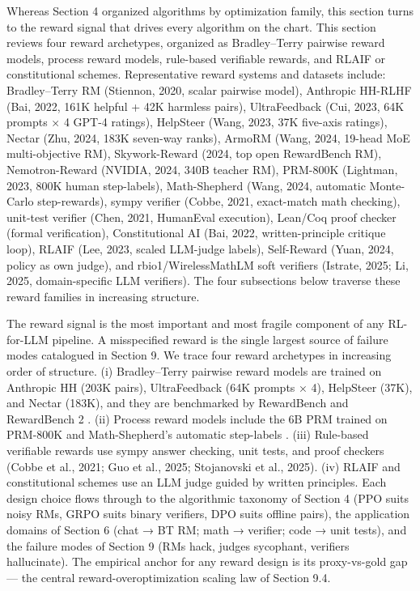 \documentclass{article}
\begin{document}
Whereas Section 4 organized algorithms by optimization family, this section turns to the reward signal that drives every algorithm on the chart. This section reviews four reward archetypes, organized as Bradley--Terry pairwise reward models, process reward models, rule-based verifiable rewards, and RLAIF or constitutional schemes. Representative reward systems and datasets include: Bradley--Terry RM (Stiennon, 2020, scalar pairwise model), Anthropic HH-RLHF (Bai, 2022, 161K helpful + 42K harmless pairs), UltraFeedback (Cui, 2023, 64K prompts × 4 GPT-4 ratings), HelpSteer (Wang, 2023, 37K five-axis ratings), Nectar (Zhu, 2024, 183K seven-way ranks), ArmoRM (Wang, 2024, 19-head MoE multi-objective RM), Skywork-Reward (2024, top open RewardBench RM), Nemotron-Reward (NVIDIA, 2024, 340B teacher RM), PRM-800K (Lightman, 2023, 800K human step-labels), Math-Shepherd (Wang, 2024, automatic Monte-Carlo step-rewards), sympy verifier (Cobbe, 2021, exact-match math checking), unit-test verifier (Chen, 2021, HumanEval execution), Lean/Coq proof checker (formal verification), Constitutional AI (Bai, 2022, written-principle critique loop), RLAIF (Lee, 2023, scaled LLM-judge labels), Self-Reward (Yuan, 2024, policy as own judge), and rbio1/WirelessMathLM soft verifiers (Istrate, 2025; Li, 2025, domain-specific LLM verifiers). The four subsections below traverse these reward families in increasing structure.

The reward signal is the most important and most fragile component of any RL-for-LLM pipeline. A misspecified reward is the single largest source of failure modes catalogued in Section 9. We trace four reward archetypes in increasing order of structure. (i) Bradley--Terry pairwise reward models are trained on Anthropic HH (203K pairs), UltraFeedback (64K prompts × 4), HelpSteer (37K), and Nectar (183K), and they are benchmarked by RewardBench \citep{lambert20242024} and RewardBench 2 \citep{malik20252025}. (ii) Process reward models include the 6B PRM trained on PRM-800K \citep{lightman2023letsverifystepbyst} and Math-Shepherd's automatic step-labels \citep{wang2024interpretableprefe}. (iii) Rule-based verifiable rewards use sympy answer checking, unit tests, and proof checkers (Cobbe et al., 2021; Guo et al., 2025; Stojanovski et al., 2025). (iv) RLAIF and constitutional schemes \citep{bai20222022} use an LLM judge guided by written principles. Each design choice flows through to the algorithmic taxonomy of Section 4 (PPO suits noisy RMs, GRPO suits binary verifiers, DPO suits offline pairs), the application domains of Section 6 (chat → BT RM; math → verifier; code → unit tests), and the failure modes of Section 9 (RMs hack, judges sycophant, verifiers hallucinate). The empirical anchor for any reward design is its proxy-vs-gold gap \citep{gao2023scalinglawsforrewa} --- the central reward-overoptimization scaling law of Section 9.4.
\end{document}
